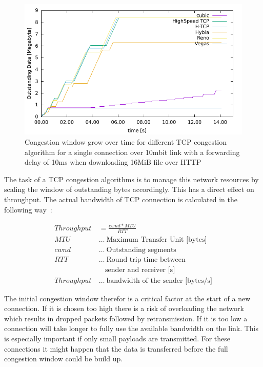 \begin{figure}[ht]
\footnotesize
\includegraphics[scale=1]{figure/b2a_owin.pdf}
\caption{Congestion window grow over time for different TCP congestion
algorithm for a single connection over 10mbit link with a forwarding delay of
10ms when downloading 16MiB file over HTTP}
\label{fig:cwnd_tcp_algos}
\end{figure}

The task of a TCP congestion algorithms is to manage this network resources by
scaling the window of outstanding bytes accordingly. This has a direct effect on
throughput. The actual bandwidth of TCP connection is calculated in the
following way~\cite{opac-b1120676}:

\begin{align}
  Throughput &= \frac{cwnd * MTU}{RTT} \\
  MTU~&\dots~\text{Maximum Transfer Unit [bytes]} \nonumber\\
  cwnd~&\dots~\text{Outstanding segments} \nonumber\\
  RTT~&\dots~\text{Round trip time between} \nonumber\\
      &~~~~\text{sender and receiver [s]} \nonumber\\
  Throughput~&\dots~\text{bandwidth of the sender [bytes/s]} \nonumber
\end{align}

The initial congestion window therefor is a critical factor at the start of a
new connection. If it is chosen too high there is a risk of overloading the
network which results in dropped packets followed by retransmission. If it is
too low a connection will take longer to fully use the available bandwidth on the
link. This is especially important if only small payloads are transmitted. For
these connections it might happen that the data is transferred before the full
congestion window could be build up.

